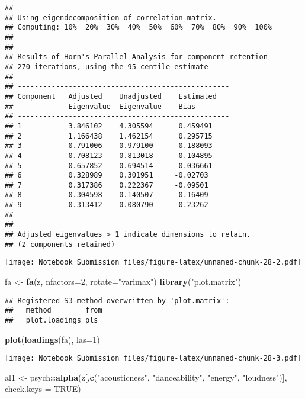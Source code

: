 \documentclass[
]{article}
\newenvironment{Shaded}{\begin{snugshade}}{\end{snugshade}}
\newcommand{\DataTypeTok}[1]{\textcolor[rgb]{0.13,0.29,0.53}{#1}}
\newcommand{\DecValTok}[1]{\textcolor[rgb]{0.00,0.00,0.81}{#1}}
\newcommand{\KeywordTok}[1]{\textcolor[rgb]{0.13,0.29,0.53}{\textbf{#1}}}
\newcommand{\NormalTok}[1]{#1}
\newcommand{\OperatorTok}[1]{\textcolor[rgb]{0.81,0.36,0.00}{\textbf{#1}}}
\newcommand{\OtherTok}[1]{\textcolor[rgb]{0.56,0.35,0.01}{#1}}
\newcommand{\StringTok}[1]{\textcolor[rgb]{0.31,0.60,0.02}{#1}}
\begin{document}
\begin{verbatim}
## 
## Using eigendecomposition of correlation matrix.
## Computing: 10%  20%  30%  40%  50%  60%  70%  80%  90%  100%
## 
## 
## Results of Horn's Parallel Analysis for component retention
## 270 iterations, using the 95 centile estimate
## 
## -------------------------------------------------- 
## Component   Adjusted    Unadjusted    Estimated 
##             Eigenvalue  Eigenvalue    Bias 
## -------------------------------------------------- 
## 1           3.846102    4.305594      0.459491
## 2           1.166438    1.462154      0.295715
## 3           0.791006    0.979100      0.188093
## 4           0.708123    0.813018      0.104895
## 5           0.657852    0.694514      0.036661
## 6           0.328989    0.301951     -0.02703
## 7           0.317386    0.222367     -0.09501
## 8           0.304598    0.140507     -0.16409
## 9           0.313412    0.080790     -0.23262
## -------------------------------------------------- 
## 
## Adjusted eigenvalues > 1 indicate dimensions to retain.
## (2 components retained)
\end{verbatim}

\texttt{[image: Notebook\_Submission\_files/figure-latex/unnamed-chunk-28-2.pdf]}

\begin{Shaded}
\begin{Highlighting}[]
\NormalTok{fa <-}\StringTok{ }\KeywordTok{fa}\NormalTok{(z, }\DataTypeTok{nfactors=}\DecValTok{2}\NormalTok{, }\DataTypeTok{rotate=}\StringTok{"varimax"}\NormalTok{)}
\KeywordTok{library}\NormalTok{(}\StringTok{"plot.matrix"}\NormalTok{)}
\end{Highlighting}
\end{Shaded}

\begin{verbatim}
## Registered S3 method overwritten by 'plot.matrix':
##   method        from
##   plot.loadings pls
\end{verbatim}

\begin{Shaded}
\begin{Highlighting}[]
\KeywordTok{plot}\NormalTok{(}\KeywordTok{loadings}\NormalTok{(fa), }\DataTypeTok{las=}\DecValTok{1}\NormalTok{)}
\end{Highlighting}
\end{Shaded}

\texttt{[image: Notebook\_Submission\_files/figure-latex/unnamed-chunk-28-3.pdf]}

\begin{Shaded}
\begin{Highlighting}[]
\NormalTok{al1 <-}\StringTok{ }\NormalTok{psych}\OperatorTok{::}\KeywordTok{alpha}\NormalTok{(z[,}\KeywordTok{c}\NormalTok{(}\StringTok{"acousticness"}\NormalTok{, }\StringTok{"danceability"}\NormalTok{, }\StringTok{"energy"}\NormalTok{, }\StringTok{"loudness"}\NormalTok{)], }\DataTypeTok{check.keys =} \OtherTok{TRUE}\NormalTok{)}
\end{Highlighting}
\end{Shaded}
\end{document}
